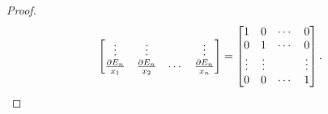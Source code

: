 \begin{enumerate}
\begin{proof}
\[\begin{bmatrix}
                    \vdots & \vdots &  & \vdots \\ 
                    \frac{\partial{E_n}}{x_1} & \frac{\partial{E_n}}{x_2} & \cdots & \frac{\partial{E_n}}{x_n} \\ 
                \end{bmatrix}
                =
                \begin{bmatrix}
                    1 & 0 & \cdots & 0 \\
                    0 & 1 & \cdots & 0 \\
                    \vdots & \vdots & & \vdots \\
                    0 & 0 & \cdots & 1
                \end{bmatrix}. \qedhere    
            \]
        \end{proof}
\end{enumerate}
% 
